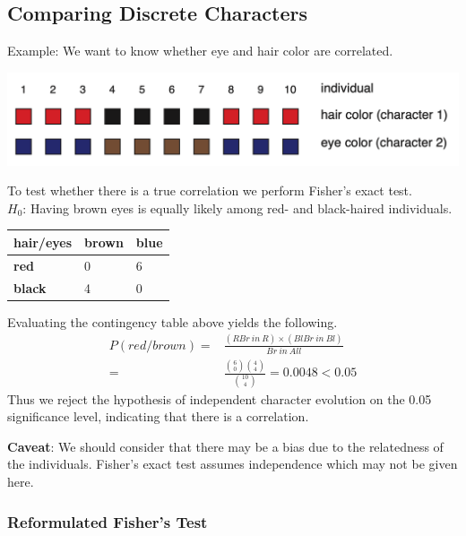 \documentclass{article}
\begin{document}
\begin{multicols*}{3}
\subsection{Comparing Discrete Characters}

Example: We want to know whether eye and hair color are correlated. 

\begin{center}
    \includegraphics[width=1\linewidth, angle=0.6]{compdischar.png}
\end{center}

To test whether there is a true correlation we perform Fisher's exact test.\\
$H_0$: Having brown eyes is equally likely among red- and black-haired individuals.\\

\begin{tabular}{|l|l|l|}
\hline
\textbf{hair/eyes} & \textbf{brown} & \textbf{blue} \\ \hline
\textbf{red}       & 0              & 6             \\ \hline
\textbf{black}     & 4              & 0             \\ \hline
\end{tabular}

Evaluating the contingency table above yields the following. 
{
\footnotesize
\begin{align*}
P(red/brown) =& \frac{(RBr\ in\ R)\times (BlBr\ in\ Bl)}{Br\ in\ All}\\
=& \frac{{6\choose 0}{4\choose 4}}{{10\choose 4}} = 0.0048 < 0.05
\end{align*}
}
Thus we reject the hypothesis of independent character evolution on the 0.05 significance level, indicating that there is a correlation. 

\textbf{Caveat}: We should consider that there may be a bias due to the relatedness of the individuals. Fisher's exact test assumes independence which may not be given here.\\

\subsubsection{Reformulated Fisher's Test}


\end{multicols*}
\end{document}
